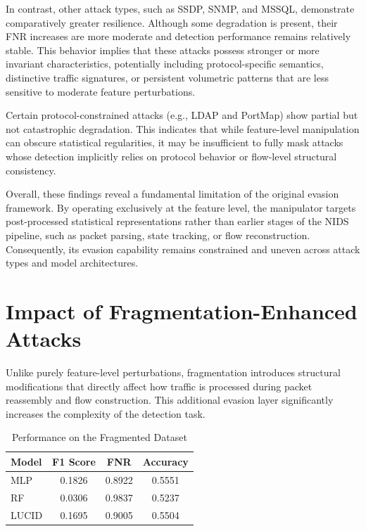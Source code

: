 In contrast, other attack types, such as SSDP, SNMP, and MSSQL, demonstrate comparatively greater resilience. Although some degradation is present, their FNR increases are more moderate and detection performance remains relatively stable. This behavior implies that these attacks possess stronger or more invariant characteristics, potentially including protocol-specific semantics, distinctive traffic signatures, or persistent volumetric patterns that are less sensitive to moderate feature perturbations.

Certain protocol-constrained attacks (e.g., LDAP and PortMap) show partial but not catastrophic degradation. This indicates that while feature-level manipulation can obscure statistical regularities, it may be insufficient to fully mask attacks whose detection implicitly relies on protocol behavior or flow-level structural consistency.

Overall, these findings reveal a fundamental limitation of the original evasion framework. By operating exclusively at the feature level, the manipulator targets post-processed statistical representations rather than earlier stages of the NIDS pipeline, such as packet parsing, state tracking, or flow reconstruction. Consequently, its evasion capability remains constrained and uneven across attack types and model architectures.

\section{Impact of Fragmentation-Enhanced Attacks}
Unlike purely feature-level perturbations, fragmentation introduces structural modifications that directly affect how traffic is processed during packet reassembly and flow construction. This additional evasion layer significantly increases the complexity of the detection task.

\begin{table}[h]
\centering
\begin{tabular}{lccc}
\hline
Model & F1 Score & FNR & Accuracy \\
\hline
MLP   & 0.1826 & 0.8922 & 0.5551 \\
RF    & 0.0306 & 0.9837 & 0.5237 \\
LUCID & 0.1695 & 0.9005 & 0.5504 \\
\hline
\end{tabular}
\caption{Performance on the Fragmented Dataset}
\label{tab:fragmented}
\end{table}



